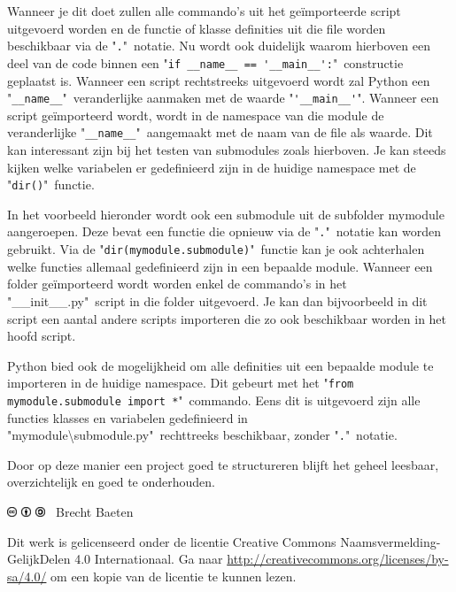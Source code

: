 \documentclass[11pt,twoside]{article}
\begin{document}
Wanneer je dit doet zullen alle commando's uit het geïmporteerde script uitgevoerd worden en de functie of klasse definities uit die file worden beschikbaar via de "\lstinline{.}"\ notatie. Nu wordt ook duidelijk waarom hierboven een deel van de code binnen een "\lstinline{if __name__ == '__main__':}"\ constructie geplaatst is. Wanneer een script rechtstreeks uitgevoerd wordt zal Python een "\lstinline{__name__}"\ veranderlijke aanmaken met de waarde "\lstinline{'__main__'}". Wanneer een script geïmporteerd wordt, wordt in de namespace van die module de veranderlijke "\lstinline{__name__}"\ aangemaakt met de naam van de file als waarde. Dit kan interessant zijn bij het testen van submodules zoals hierboven. Je kan steeds kijken welke variabelen er gedefinieerd zijn in de huidige namespace met de "\lstinline{dir()}"\ functie.

In het voorbeeld hieronder wordt ook een submodule uit de subfolder \textsf{mymodule} aangeroepen. Deze bevat een functie die opnieuw via de "\lstinline{.}"\ notatie kan worden gebruikt. Via de "\lstinline{dir(mymodule.submodule)}"\ functie kan je ook achterhalen welke functies allemaal gedefinieerd zijn in een bepaalde module. Wanneer een folder geïmporteerd wordt worden enkel de commando's in het "\textsf{\_\_init\_\_.py}"\ script in die folder uitgevoerd. Je kan dan bijvoorbeeld in dit script een aantal andere scripts importeren die zo ook beschikbaar worden in het hoofd script.


Python bied ook de mogelijkheid om alle definities uit een bepaalde module te importeren in de huidige namespace. Dit gebeurt met het "\lstinline{from mymodule.submodule import *}"\ commando. Eens dit is uitgevoerd zijn alle functies klasses en variabelen gedefinieerd in "\textsf{mymodule\textbackslash submodule.py}"\ rechttreeks beschikbaar, zonder "\lstinline{.}"\ notatie.

Door op deze manier een project goed te structureren blijft het geheel leesbaar, overzichtelijk en goed te onderhouden.
\vspace{2cm}

\null
\vfill
\includegraphics[height=0.3cm]{fig/cc}
\includegraphics[height=0.3cm]{fig/by}
\includegraphics[height=0.3cm]{fig/sa}
\quad \the\year\ Brecht Baeten
\vspace{0.5cm}

Dit werk is gelicenseerd onder de licentie Creative Commons Naamsvermelding-GelijkDelen 4.0 Internationaal. Ga naar \url{http://creativecommons.org/licenses/by-sa/4.0/} om een kopie van de licentie te kunnen lezen.
\vspace{1cm}
\end{document}

